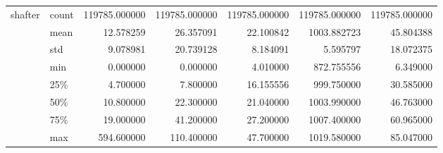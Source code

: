 \begin{tabular}{llrrrrr}
shafter & count &  119785.000000 &  119785.000000 &  119785.000000 &  119785.000000 &  119785.000000 \\
        & mean &      12.578259 &      26.357091 &      22.100842 &    1003.882723 &      45.804388 \\
        & std &       9.078981 &      20.739128 &       8.184091 &       5.595797 &      18.072375 \\
        & min &       0.000000 &       0.000000 &       4.010000 &     872.755556 &       6.349000 \\
        & 25\% &       4.700000 &       7.800000 &      16.155556 &     999.750000 &      30.585000 \\
        & 50\% &      10.800000 &      22.300000 &      21.040000 &    1003.990000 &      46.763000 \\
        & 75\% &      19.000000 &      41.200000 &      27.200000 &    1007.400000 &      60.965000 \\
        & max &     594.600000 &     110.400000 &      47.700000 &    1019.580000 &      85.047000 \\
\bottomrule
\end{tabular}
